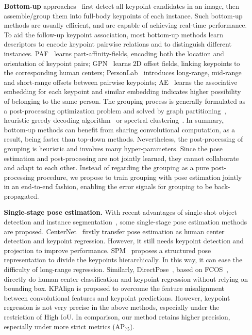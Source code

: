 \documentclass[runningheads]{llncs}
\begin{document}
	\textbf{Bottom-up} approaches~\cite{cao2017realtime,Insafutdinov2016ArtTrack,Insafutdinov2016DeeperCut,Iqbal2016PoseTrack,jin2019multi,jin2017towards,newell2017associative,nie2017generative,papandreou2018personlab,pishchulin2016deepcut} first detect all keypoint candidates in an image, then assemble/group them into full-body keypoints of each instance. Such bottom-up methods are usually efficient, and are capable of achieving real-time performance. To aid the follow-up keypoint association, most bottom-up methods learn descriptors to encode keypoint pairwise relations and to distinguish different instances. PAF~\cite{cao2017realtime} learns part-affinity-fields, encoding both the location and orientation of keypoint pairs; GPN~\cite{nie2017generative} learns 2D offset fields, linking keypoints to the corresponding human centers; PersonLab~\cite{papandreou2018personlab} introduces long-range, mid-range and short-range offsets between pairwise keypoints; AE~\cite{newell2017associative} learns the associative embedding for each keypoint and similar embedding indicates higher possibility of belonging to the same person. The grouping process is generally formulated as a post-processing optimization problem and solved by graph partitioning~\cite{Insafutdinov2016ArtTrack,Insafutdinov2016DeeperCut,Iqbal2016PoseTrack,pishchulin2016deepcut}, heuristic greedy decoding algorithm~\cite{cao2017realtime,papandreou2018personlab} or spectral clustering~\cite{nie2017generative}.
	In summary, bottom-up methods can benefit from sharing convolutional computation, as a result, being faster than top-down methods. Nevertheless, the post-processing of grouping is heuristic and involves many hyper-parameters. Since the pose estimation and post-processing are not jointly learned, they cannot collaborate and adapt to each other.
	Instead of regarding the grouping as a pure post-processing procedure, we propose to train grouping with pose estimation jointly in an end-to-end fashion, enabling the error signals for grouping to be back-propagated.
	
	\textbf{Single-stage pose estimation.}
	With recent advantages of single-shot object detection and instance segmentation~\cite{tian2019fcos,xie2019polarmask,zhou2019objects}, some single-stage pose estimation methods are proposed. CenterNet~\cite{zhou2019objects} firstly transfer pose estimation as human center detection and keypoint regression. However, it still needs keypoint detection and projection to improve performance.
	SPM~\cite{nie2019single} proposes a structured pose representation to divide the keypoints hierarchically. In this way, it can ease the difficulty of long-range regression. 
	Similarly, DirectPose~\cite{tian2019directpose}, based on FCOS~\cite{tian2019fcos}, directly do human center classification and keypoint regression without relying on bounding box. KPAlign is proposed to overcome the feature misalignment between convolutional features and keypoint predictions.
	However, keypoint regression is not very precise in the above methods, especially under the restriction of High IoU. In comparison, our method retains higher precision, especially under more strict metrics (AP$_{75}$).
	
\end{document}

